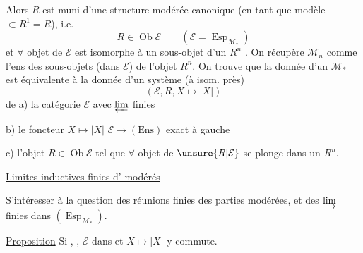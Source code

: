 Alors $R$ est muni d'une structure modérée canonique (en tant que modèle $\subset R^1=R$), i.e.
\[
 R\in\operatorname{Ob}\mathcal E\qquad(\mathcal E=\operatorname{Esp}_{\mathcal M_*})
\]
et $\forall$ objet de $\mathcal E$ est isomorphe à un sous-objet d'un $R^n$ . On récupère $\mathcal M_n$ comme l'ens des sous-objets  (dans $\mathcal E$) de l'objet $R^n$. On trouve que la donnée d'un $\mathcal M_*$ est équivalente à la donnée d'un système (à isom. près)
\[
 (\mathcal E,R,X\longmapsto |X|)
\]
de a) la catégorie $\mathcal E$ avec $\varprojlim$ finies

b) le foncteur $X\mapsto |X|$ $\mathcal E\longrightarrow(\mathrm{Ens})$ exact à gauche

c) l'objet $R\in\operatorname{Ob}\mathcal E$ tel que $\forall$ objet de $\unsure{R|\mathcal E}$ se plonge dans un $R^n$.



\uline{Limites inductives finies d' modérés}

S'intéresser à la question des réunions finies des parties modérées, et des $\varinjlim$ finies dans $(\operatorname{Esp}_{\mathcal M_*})$.


\uline{Proposition} Si , ,  $\mathcal E$
 dans 
  et $X\mapsto|X|$ y commute.


